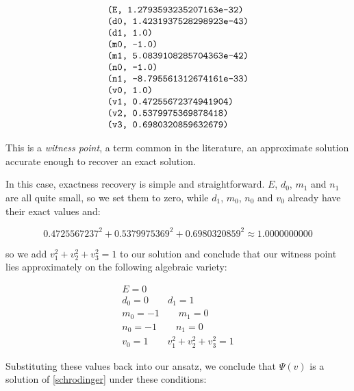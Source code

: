 \documentclass{article}
\begin{document}
\begin{equation}
\label{witness point}
\addtolength{\jot}{-3pt}
\begin{aligned}
&\verb!(E, 1.2793593235207163e-32)!\\
&\verb!(d0, 1.4231937528298923e-43)!\\
&\verb!(d1, 1.0)!\\
&\verb!(m0, -1.0)!\\
&\verb!(m1, 5.0839108285704363e-42)!\\
&\verb!(n0, -1.0)!\\
&\verb!(n1, -8.795561312674161e-33)!\\
&\verb!(v0, 1.0)!\\
&\verb!(v1, 0.47255672374941904)!\\
&\verb!(v2, 0.5379975369878418)!\\
&\verb!(v3, 0.6980320859632679)!
\end{aligned}
\end{equation}

This is a {\it witness point}, a term common in the literature, an approximate solution accurate enough
to recover an exact solution.

In this case, exactness recovery is simple and straightforward.  $E$, $d_0$, $m_1$ and $n_1$ are all quite small,
so we set them to zero, while $d_1$, $m_0$, $n_0$ and $v_0$ already have their exact values and:

\begin{equation*}
0.4725567237^2 + 0.5379975369^2 + 0.6980320859^2 \approx  1.0000000000
\end{equation*}

so we add $v_1^2 + v_2^2 + v_3^2 = 1$ to our solution and conclude that our witness point lies approximately
on the following algebraic variety:

\begin{equation}
\begin{gathered}
E = 0 \\
d_0 = 0 \qquad
d_1 = 1 \\
m_0 = -1 \qquad
m_1 = 0 \\
n_0 = -1 \qquad
n_1 = 0 \\
v_0 = 1 \qquad
v_1^2 + v_2^2 + v_3^2 = 1
\end{gathered}
\end{equation}

Substituting these values back into our ansatz, we conclude that $\Psi(v)$
is a solution of \eqref{schrodinger} under these conditions:
\end{document}
